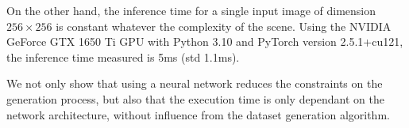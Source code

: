 \documentclass{egpubl}
\begin{document}
On the other hand, the inference time for a single input image of dimension $256 \times 256$ is constant whatever the complexity of the scene. Using the NVIDIA GeForce GTX 1650 Ti GPU with Python 3.10 and PyTorch version 2.5.1+cu121, the inference time measured is 5ms (std 1.1ms). 

We not only show that using a neural network reduces the constraints on the generation process, but also that the execution time is only dependant on the network architecture, without influence from the dataset generation algorithm. 












\end{document}
